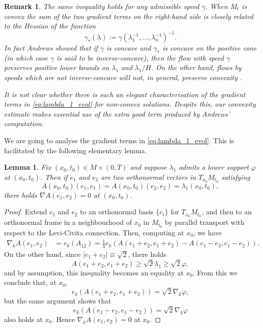 \documentclass[12pt]{amsart}
\newtheorem{lemma}[theorem]{Lemma}
\newtheorem{remark}[theorem]{Remark}
\begin{document}
\begin{remark}
\label{rem:inverse-concavity}
The same inequality holds for any admissible speed $\gamma$. When $M_t$ is convex the sum of the two gradient terms on the right-hand side is closely related to the Hessian of the function
\[\gamma_*(\lambda) := \gamma(\lambda_1^{-1}, \dots, \lambda_n^{-1})^{-1}.\]
In fact Andrews showed that if $\gamma$ is concave and $\gamma_*$ is concave on the positive cone (in which case $\gamma$ is said to be inverse-concave), then the flow with speed $\gamma$ preserves positive lower bounds on $\lambda_1$ and $\lambda_1 / H$. On the other hand, flows by speeds which are not inverse-concave will not, in general, preserve convexity \cite{AMY}.

It is not clear whether there is such an elegant characterisation of the gradient terms in \eqref{eq:lambda_1_evol} for non-convex solutions. Despite this, our convexity estimate makes essential use of the extra good term produced by Andrews' computation.  
\end{remark}

We are going to analyse the gradient terms in \eqref{eq:lambda_1_evol}. This is facilitated by the following elementary lemma. 

\begin{lemma}
\label{lem:lin_alg}
Fix $(x_0,t_0) \in M\times(0,T)$ and suppose $\lambda_1$ admits a lower support $\varphi$ at $(x_0,t_0)$. Then if $e_1$ and $e_2$ are two orthonormal vectors in $T_{x_0} M_{t_0}$ satisfying
\[A(x_0,t_0)(e_1, e_1) = A(x_0,t_0) (e_2, e_2) = \lambda_1(x_0,t_0),\]
there holds $\nabla A(e_1, e_2) = 0$ at $(x_0,t_0)$. 
\end{lemma}

\begin{proof}
Extend $e_1$ and $e_2$ to an orthonormal basis $\{e_i\}$ for $T_{x_0} M_{t_0}$, and then to an orthonormal frame in a neighbourhood of $x_0$ in $M_{t_0}$ by parallel transport with respect to the Levi-Civita connection. Then, computing at $x_0$, we have 
\begin{align*}
\nabla_k A(e_1, e_2) &= e_k( A_{12})  = \frac{1}{4} e_k (A(e_1 + e_2, e_1 + e_2) - A(e_1 - e_2, e_1 - e_2)).
\end{align*}
On the other hand, since $|e_1 + e_2| \equiv \sqrt{2}$, there holds 
\[A(e_1 + e_2, e_1+ e_2) \geq \sqrt{2} \lambda_1 \geq \sqrt{2} \varphi,\]
and by assumption, this inequality becomes an equality at $x_0$. From this we conclude that, at $x_0$, 
\[e_k (A(e_1 + e_2, e_1 + e_2) )= \sqrt{2} \nabla_k \varphi,\]
but the same argument shows that 
\[e_k( A(e_1 - e_2, e_1 - e_2) )= \sqrt{2} \nabla_k \varphi\]
also holds at $x_0$. Hence $\nabla_k A(e_1, e_2) = 0$ at $x_0$.    
\end{proof}
\end{document}
